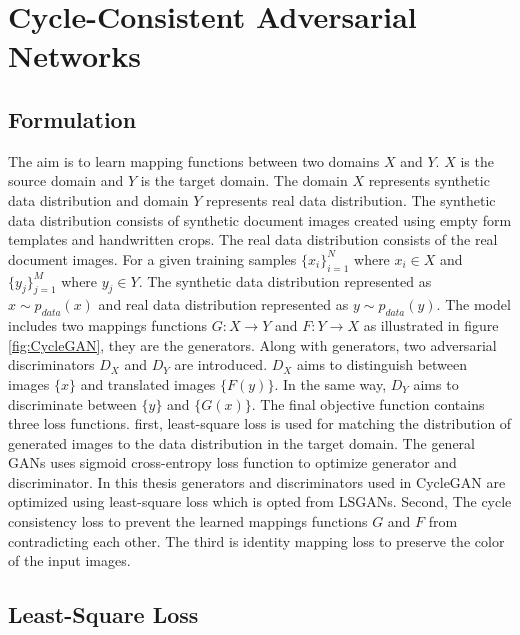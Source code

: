 \section{Cycle-Consistent Adversarial Networks}\label{CycleConsistentAdversarialNetworks}


\subsection{Formulation}


The aim is to learn mapping functions between two domains $X$ and $Y$. $X$ is the source domain and $Y$ is the target domain. The domain $X$ represents synthetic data distribution and domain $Y$ represents real data distribution. The synthetic data distribution consists of synthetic document images created using empty form templates and handwritten crops. The real data distribution consists of the real document images. For a given training samples $\{x_i\}_{i=1}^{N}$ where $x_i \in X$ and $\{y_j\}_{j=1}^{M}$ where $y_j \in Y$. The synthetic data distribution represented as $x \sim p_{data}(x)$ and real data distribution represented as $y \sim p_{data}(y)$. The model includes two mappings functions $G : X \rightarrow Y$ and $F : Y \rightarrow X$ as illustrated in figure \ref{fig:CycleGAN}, they are the generators. Along with generators, two adversarial discriminators $D_X$ and $D_Y$ are introduced. $D_X$ aims to distinguish between images $\{x\}$ and translated images $\{F(y)\}$. In the same way, $D_Y$ aims to discriminate between $\{y\}$ and $\{G(x)\}$.  The final objective function contains three loss functions. first, least-square loss\cite{mao2017squares} is used for matching the distribution of generated images to the data distribution in the target domain. The general \acp{GAN} uses sigmoid cross-entropy loss function to optimize generator and discriminator. In this thesis generators and discriminators used in \ac{CycleGAN} are optimized using least-square loss\cite{mao2017squares} which is opted from \acp{LSGAN}. Second, The cycle consistency loss to prevent the learned mappings functions $G$ and $F$ from contradicting each other\cite{zhu2020unpaired}. The third is identity mapping loss to preserve the color of the input images\cite{zhu2020unpaired}.


\subsection{Least-Square Loss}


